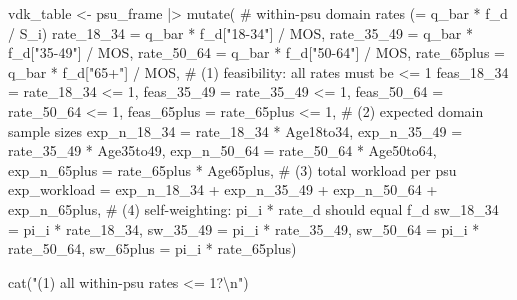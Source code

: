 \documentclass[
  11pt,
]{article}
\newenvironment{Shaded}{\begin{snugshade}}{\end{snugshade}}
\newcommand{\AttributeTok}[1]{\textcolor[rgb]{0.40,0.45,0.13}{#1}}
\newcommand{\CommentTok}[1]{\textcolor[rgb]{0.37,0.37,0.37}{#1}}
\newcommand{\DecValTok}[1]{\textcolor[rgb]{0.68,0.00,0.00}{#1}}
\newcommand{\FunctionTok}[1]{\textcolor[rgb]{0.28,0.35,0.67}{#1}}
\newcommand{\NormalTok}[1]{\textcolor[rgb]{0.00,0.23,0.31}{#1}}
\newcommand{\OtherTok}[1]{\textcolor[rgb]{0.00,0.23,0.31}{#1}}
\newcommand{\SpecialCharTok}[1]{\textcolor[rgb]{0.37,0.37,0.37}{#1}}
\newcommand{\StringTok}[1]{\textcolor[rgb]{0.13,0.47,0.30}{#1}}
\begin{document}
\begin{Shaded}
\begin{Highlighting}[]
\NormalTok{vdk\_table }\OtherTok{\textless{}{-}}\NormalTok{ psu\_frame }\SpecialCharTok{|\textgreater{}}
  \FunctionTok{mutate}\NormalTok{(}
    \CommentTok{\# within{-}psu domain rates (= q\_bar * f\_d / S\_i)}
    \AttributeTok{rate\_18\_34  =}\NormalTok{ q\_bar }\SpecialCharTok{*}\NormalTok{ f\_d[}\StringTok{"18{-}34"}\NormalTok{]  }\SpecialCharTok{/}\NormalTok{ MOS,}
    \AttributeTok{rate\_35\_49  =}\NormalTok{ q\_bar }\SpecialCharTok{*}\NormalTok{ f\_d[}\StringTok{"35{-}49"}\NormalTok{]  }\SpecialCharTok{/}\NormalTok{ MOS,}
    \AttributeTok{rate\_50\_64  =}\NormalTok{ q\_bar }\SpecialCharTok{*}\NormalTok{ f\_d[}\StringTok{"50{-}64"}\NormalTok{]  }\SpecialCharTok{/}\NormalTok{ MOS,}
    \AttributeTok{rate\_65plus =}\NormalTok{ q\_bar }\SpecialCharTok{*}\NormalTok{ f\_d[}\StringTok{"65+"}\NormalTok{]    }\SpecialCharTok{/}\NormalTok{ MOS,}
    \CommentTok{\# (1) feasibility: all rates must be \textless{}= 1}
    \AttributeTok{feas\_18\_34 =}\NormalTok{ rate\_18\_34 }\SpecialCharTok{\textless{}=} \DecValTok{1}\NormalTok{, }\AttributeTok{feas\_35\_49 =}\NormalTok{ rate\_35\_49 }\SpecialCharTok{\textless{}=} \DecValTok{1}\NormalTok{,}
    \AttributeTok{feas\_50\_64 =}\NormalTok{ rate\_50\_64 }\SpecialCharTok{\textless{}=} \DecValTok{1}\NormalTok{, }\AttributeTok{feas\_65plus =}\NormalTok{ rate\_65plus }\SpecialCharTok{\textless{}=} \DecValTok{1}\NormalTok{,}
    \CommentTok{\# (2) expected domain sample sizes}
    \AttributeTok{exp\_n\_18\_34  =}\NormalTok{ rate\_18\_34 }\SpecialCharTok{*}\NormalTok{ Age18to34,}
    \AttributeTok{exp\_n\_35\_49  =}\NormalTok{ rate\_35\_49 }\SpecialCharTok{*}\NormalTok{ Age35to49,}
    \AttributeTok{exp\_n\_50\_64  =}\NormalTok{ rate\_50\_64 }\SpecialCharTok{*}\NormalTok{ Age50to64,}
    \AttributeTok{exp\_n\_65plus =}\NormalTok{ rate\_65plus }\SpecialCharTok{*}\NormalTok{ Age65plus,}
    \CommentTok{\# (3) total workload per psu}
    \AttributeTok{exp\_workload =}\NormalTok{ exp\_n\_18\_34 }\SpecialCharTok{+}\NormalTok{ exp\_n\_35\_49 }\SpecialCharTok{+}\NormalTok{ exp\_n\_50\_64 }\SpecialCharTok{+}\NormalTok{ exp\_n\_65plus,}
    \CommentTok{\# (4) self{-}weighting: pi\_i * rate\_d should equal f\_d}
    \AttributeTok{sw\_18\_34 =}\NormalTok{ pi\_i }\SpecialCharTok{*}\NormalTok{ rate\_18\_34, }\AttributeTok{sw\_35\_49 =}\NormalTok{ pi\_i }\SpecialCharTok{*}\NormalTok{ rate\_35\_49,}
    \AttributeTok{sw\_50\_64 =}\NormalTok{ pi\_i }\SpecialCharTok{*}\NormalTok{ rate\_50\_64, }\AttributeTok{sw\_65plus =}\NormalTok{ pi\_i }\SpecialCharTok{*}\NormalTok{ rate\_65plus)}

\FunctionTok{cat}\NormalTok{(}\StringTok{"(1) all within{-}psu rates \textless{}= 1?}\SpecialCharTok{\textbackslash{}n}\StringTok{"}\NormalTok{)}
\end{Highlighting}
\end{Shaded}
\end{document}
